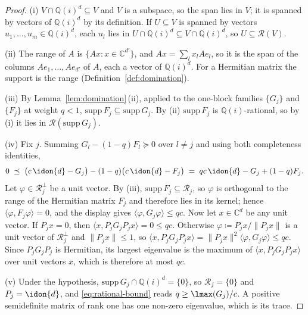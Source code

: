 \begin{proof}
(i) $V\cap\mathbb{Q}(i)^{d}\subseteq V$ and $V$ is a subspace, so the span
lies in $V$; it is spanned by vectors of $\mathbb{Q}(i)^{d}$ by its
definition. If $U\subseteq V$ is spanned by vectors
$u_1,\dots,u_m\in\mathbb{Q}(i)^{d}$, each $u_l$ lies in
$U\cap\mathbb{Q}(i)^{d}\subseteq V\cap\mathbb{Q}(i)^{d}$, so
$U\subseteq\mathcal{R}(V)$.

(ii) The range of $A$ is $\{Ax:x\in\mathbb{C}^{d'}\}$, and
$Ax=\sum_lx_lAe_l$, so it is the span of the columns $Ae_1,\dots,Ae_{d'}$ of
$A$, each a vector of $\mathbb{Q}(i)^{d}$. For a Hermitian matrix the support
is the range (Definition~\ref{def:domination}).

(iii) By Lemma~\ref{lem:domination}\,(ii), applied to the one-block families
$\{G_j\}$ and $\{F_j\}$ at weight $q<1$,
$\mathrm{supp}\,F_j\subseteq\mathrm{supp}\,G_j$. By (ii) $\mathrm{supp}\,F_j$
is $\mathbb{Q}(i)$-rational, so by (i) it lies in
$\mathcal{R}(\mathrm{supp}\,G_j)$.

(iv) Fix $j$. Summing $G_l-(1-q)F_l\succeq0$ over $l\neq j$ and using both
completeness identities,
\begin{equation*}
  0\;\preceq\;\big(c\,\idon{d}-G_j\big)-(1-q)\big(c\,\idon{d}-F_j\big)
  \;=\;qc\,\idon{d}-G_j+(1-q)F_j .
\end{equation*}
Let $\varphi\in\mathcal{R}_j^{\perp}$ be a unit vector. By (iii),
$\mathrm{supp}\,F_j\subseteq\mathcal{R}_j$, so $\varphi$ is orthogonal to the
range of the Hermitian matrix $F_j$ and therefore lies in its kernel; hence
$\langle\varphi,F_j\varphi\rangle=0$, and the display gives
$\langle\varphi,G_j\varphi\rangle\le qc$. Now let $x\in\mathbb{C}^{d}$ be any
unit vector. If $P_jx=0$, then $\langle x,P_jG_jP_jx\rangle=0\le qc$.
Otherwise $\varphi\coloneqq P_jx/\|P_jx\|$ is a unit vector of
$\mathcal{R}_j^{\perp}$ and $\|P_jx\|\le1$, so
$\langle x,P_jG_jP_jx\rangle=\|P_jx\|^{2}\langle\varphi,G_j\varphi\rangle\le qc$.
Since $P_jG_jP_j$ is Hermitian, its largest eigenvalue is the maximum of
$\langle x,P_jG_jP_jx\rangle$ over unit vectors $x$, which is therefore at most
$qc$.

(v) Under the hypothesis, $\mathrm{supp}\,G_j\cap\mathbb{Q}(i)^{d}=\{0\}$, so
$\mathcal{R}_j=\{0\}$ and $P_j=\idon{d}$, and \eqref{eq:rational-bound} reads
$q\ge\lmax(G_j)/c$. A positive semidefinite matrix of rank one has one
non-zero eigenvalue, which is its trace.
\end{proof}
